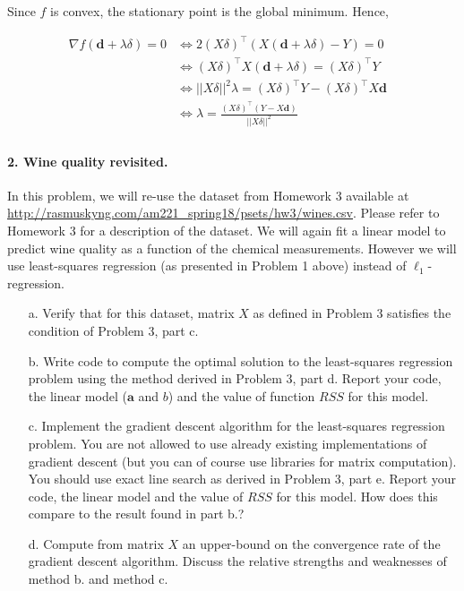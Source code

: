 \documentclass[11pt]{article}
\theoremstyle{remark}
\newcommand{\bd}{\mathbf{d}}
\newcommand{\ba}{\mathbf{a}}
\begin{document}
\begin{itemize}
Since $f$ is convex, the stationary point is the global minimum. Hence,

\begin{align*}
\nabla f(\bd+\lambda \delta)=0 &\Leftrightarrow 2(X\delta)^\intercal(X(\bd+\lambda \delta)-Y) = 0&\\
&\Leftrightarrow (X\delta)^\intercal X(\bd+\lambda \delta) = (X\delta)^\intercal Y&\\
&\Leftrightarrow ||X\delta||^2 \lambda = (X\delta)^\intercal Y- (X\delta)^\intercal X\bd &\\
&\Leftrightarrow  \lambda = \frac{(X\delta)^\intercal (Y-X\bd)}{||X\delta||^2} &\\
\end{align*}

\end{itemize}
\color{black}

\paragraph{2. Wine quality revisited.}

In this problem, we will re-use the dataset from Homework 3 available at
\url{http://rasmuskyng.com/am221_spring18/psets/hw3/wines.csv}. Please
refer to Homework 3 for
a description of the dataset. We will again fit a linear model to predict wine
quality as a function of the chemical measurements. However we will use
least-squares regression (as presented in Problem 1 above) instead of
$\ell_1$-regression.
\begin{itemize}
    \item[a.] Verify that for this dataset, matrix $X$ as defined in Problem
        3 satisfies the condition of Problem 3, part c.
    \item[b.] Write code to compute the optimal solution to the least-squares
        regression problem using the method derived in Problem 3, part d.
        Report your code, the linear model ($\ba$ and $b$) and the value of
        function $RSS$ for this model.
    \item[c.] Implement the gradient descent algorithm for the least-squares
        regression problem. You are not allowed to use already existing
        implementations of gradient descent (but you can of course use
        libraries for matrix computation). You should use exact line search as
        derived in Problem 3, part e. Report your code, the linear model and
        the value of $RSS$ for this model. How does this compare to the result
        found in part b.?
    \item[d.] Compute from matrix $X$ an upper-bound on the convergence rate of
        the gradient descent algorithm. Discuss the relative strengths and
        weaknesses of method b. and method c.
\end{itemize}
\end{document}
